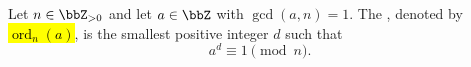\begin{definition} \label{definition:multiplicative_order_of_integer_modulo_n}
    Let $n \in \bbZ_{>0}$ and let $a \in \bbZ$ with $\gcd(a, n) = 1$. The , denoted by \hl{$\operatorname{ord}_n(a)$}, is the smallest positive integer $d$ such that
    $$a^d \equiv 1 \pmod{n}.$$
\end{definition}

